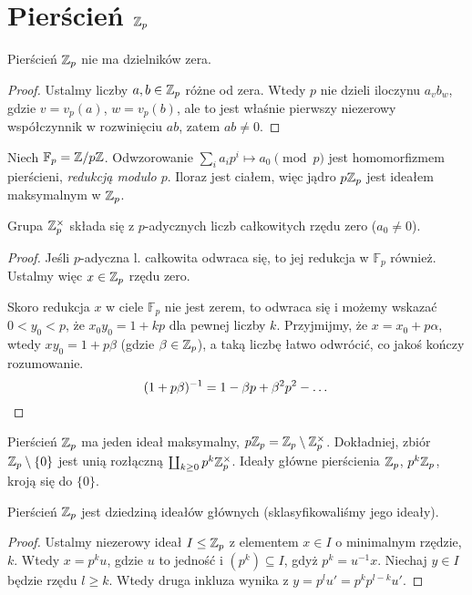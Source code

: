 \section{Pierścień $\mathbb Z_p$}
\begin{fakt}
	Pierścień $\mathbb Z_p$ nie ma dzielników zera.
\end{fakt}

\begin{proof}
	Ustalmy liczby $a, b \in \mathbb Z_p$ różne od zera.
	Wtedy $p$ nie dzieli iloczynu $a_vb_w$, gdzie $v = v_p(a)$, $w = v_p(b)$, ale to jest właśnie pierwszy niezerowy współczynnik w rozwinięciu $ab$, zatem $ab \neq 0$.
\end{proof}

Niech $\mathbb F_p = \mathbb Z / p\mathbb Z$. Odwzorowanie $\sum_i a_ip^i \mapsto a_0 \pmod p$ jest homomorfizmem pierścieni, \emph{redukcją modulo $p$}.
Iloraz jest ciałem, więc jądro $p\mathbb Z_p$ jest ideałem maksymalnym w $\mathbb Z_p$.

\begin{fakt}
	Grupa $\mathbb Z_p^\times$ składa się z $p$-adycznych liczb całkowitych rzędu zero ($a_0 \neq 0$).
\end{fakt}

\begin{proof}
	Jeśli $p$-adyczna l. całkowita odwraca się, to jej redukcja w $\mathbb F_p$ również.
	Ustalmy więc $x \in \mathbb Z_p$ rzędu zero.

	Skoro redukcja $x$ w ciele $\mathbb F_p$ nie jest zerem, to odwraca się i możemy wskazać $0 < y_0 < p$, że $x_0 y_0 =  1+  kp$ dla pewnej liczby $k$.
	Przyjmijmy, że $x = x_0 + p \alpha$, wtedy $xy_0 = 1 + p \beta$ (gdzie $\beta \in \mathbb Z_p$), a taką liczbę łatwo odwrócić, co jakoś kończy rozumowanie.
	\[
		(1+p\beta)^{-1} = 1 - \beta p + \beta^2p^2 - \ldots \qedhere
	\]
\end{proof}

Pierścień $\mathbb Z_p$ ma jeden ideał maksymalny, $p \mathbb Z_p = \mathbb Z_p \setminus \mathbb Z_p^\times$.
Dokładniej, zbiór $\mathbb Z_p \setminus \{0\}$ jest unią rozłączną $\coprod_{k \ge 0} p^k \mathbb Z_p^\times$.
Ideały główne pierścienia $\mathbb Z_p$, $p^k \mathbb Z_p$, kroją się do $\{0\}$.

\begin{fakt}
	Pierścień $\mathbb Z_p$ jest dziedziną ideałów głównych (sklasyfikowaliśmy jego ideały).
\end{fakt}

\begin{proof}
	Ustalmy  niezerowy ideał $I \le \mathbb Z_p$ z elementem $x \in I$ o minimalnym rzędzie, $k$.
	Wtedy $x = p^k u$, gdzie $u$ to jedność i $(p^k) \subseteq I$, gdyż $p^k = u^{-1} x$.
	Niechaj $y \in I$ będzie rzędu $l \ge k$.
	Wtedy druga inkluza wynika z $y = p^l u' = p^k p^{l-k} u'$.
\end{proof}